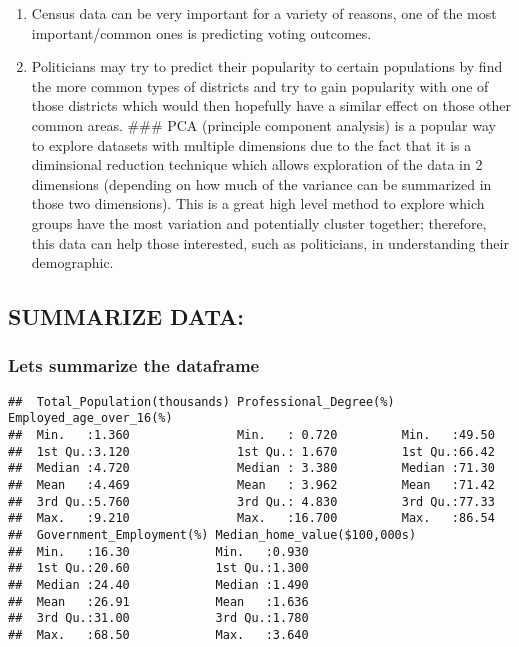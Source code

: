 \documentclass[]{article}
\providecommand{\tightlist}{%
  \setlength{\itemsep}{0pt}\setlength{\parskip}{0pt}}
\begin{document}
\begin{enumerate}
\def\labelenumi{\arabic{enumi})}
\tightlist
\item
  Census data can be very important for a variety of reasons, one of the
  most important/common ones is predicting voting outcomes.
\item
  Politicians may try to predict their popularity to certain populations
  by find the more common types of districts and try to gain popularity
  with one of those districts which would then hopefully have a similar
  effect on those other common areas. \#\#\# PCA (principle component
  analysis) is a popular way to explore datasets with multiple
  dimensions due to the fact that it is a diminsional reduction
  technique which allows exploration of the data in 2 dimensions
  (depending on how much of the variance can be summarized in those two
  dimensions). This is a great high level method to explore which groups
  have the most variation and potentially cluster together; therefore,
  this data can help those interested, such as politicians, in
  understanding their demographic.
\end{enumerate}

\hypertarget{summarize-data-1}{%
\subsection{SUMMARIZE DATA:}\label{summarize-data-1}}

\hypertarget{lets-summarize-the-dataframe}{%
\subsubsection{Lets summarize the
dataframe}\label{lets-summarize-the-dataframe}}

\begin{verbatim}
##  Total_Population(thousands) Professional_Degree(%) Employed_age_over_16(%)
##  Min.   :1.360               Min.   : 0.720         Min.   :49.50          
##  1st Qu.:3.120               1st Qu.: 1.670         1st Qu.:66.42          
##  Median :4.720               Median : 3.380         Median :71.30          
##  Mean   :4.469               Mean   : 3.962         Mean   :71.42          
##  3rd Qu.:5.760               3rd Qu.: 4.830         3rd Qu.:77.33          
##  Max.   :9.210               Max.   :16.700         Max.   :86.54          
##  Government_Employment(%) Median_home_value($100,000s)
##  Min.   :16.30            Min.   :0.930               
##  1st Qu.:20.60            1st Qu.:1.300               
##  Median :24.40            Median :1.490               
##  Mean   :26.91            Mean   :1.636               
##  3rd Qu.:31.00            3rd Qu.:1.780               
##  Max.   :68.50            Max.   :3.640
\end{verbatim}
\end{document}
